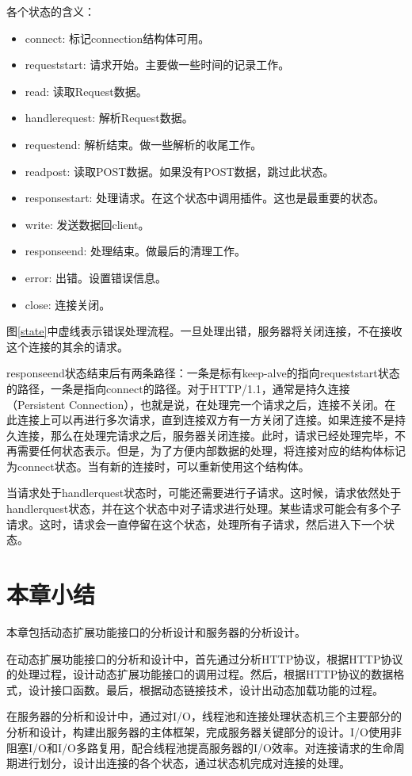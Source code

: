 \documentclass[twoside, xetex]{report}
\begin{document}
	各个状态的含义：
	\begin{itemize}
		\item connect: 标记connection结构体可用。
		\item requeststart: 请求开始。主要做一些时间的记录工作。
		\item read: 读取Request数据。
		\item handlerequest: 解析Request数据。
		\item requestend: 解析结束。做一些解析的收尾工作。
		\item readpost: 读取POST数据。如果没有POST数据，跳过此状态。
		\item responsestart: 处理请求。在这个状态中调用插件。这也是最重要的状态。
		\item write: 发送数据回client。
		\item responseend: 处理结束。做最后的清理工作。
		\item error: 出错。设置错误信息。
		\item close: 连接关闭。
	\end{itemize}
	
	图\ref{state}中虚线表示错误处理流程。一旦处理出错，服务器将关闭连接，不在接收这个连接的其余的请求。
	
	responseend状态结束后有两条路径：一条是标有keep-alve的指向requeststart状态的路径，一条是指向connect的路径。对于HTTP/1.1，通常是持久连接（Persistent Connection），也就是说，在处理完一个请求之后，连接不关闭。在此连接上可以再进行多次请求，直到连接双方有一方关闭了连接。如果连接不是持久连接，那么在处理完请求之后，服务器关闭连接。此时，请求已经处理完毕，不再需要任何状态表示。但是，为了方便内部数据的处理，将连接对应的结构体标记为connect状态。当有新的连接时，可以重新使用这个结构体。
	
	当请求处于handlerquest状态时，可能还需要进行子请求。这时候，请求依然处于handlerquest状态，并在这个状态中对子请求进行处理。某些请求可能会有多个子请求。这时，请求会一直停留在这个状态，处理所有子请求，然后进入下一个状态。
	
\section{本章小结}
	本章包括动态扩展功能接口的分析设计和服务器的分析设计。
	
	在动态扩展功能接口的分析和设计中，首先通过分析HTTP协议，根据HTTP协议的处理过程，设计动态扩展功能接口的调用过程。然后，根据HTTP协议的数据格式，设计接口函数。最后，根据动态链接技术，设计出动态加载功能的过程。
	
	在服务器的分析和设计中，通过对I/O，线程池和连接处理状态机三个主要部分的分析和设计，构建出服务器的主体框架，完成服务器关键部分的设计。I/O使用非阻塞I/O和I/O多路复用，配合线程池提高服务器的I/O效率。对连接请求的生命周期进行划分，设计出连接的各个状态，通过状态机完成对连接的处理。
	
\end{document}
